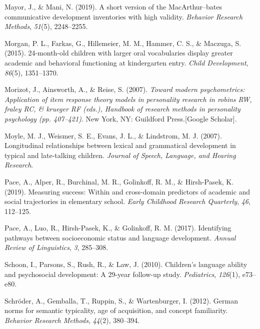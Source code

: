 \documentclass[
  man,floatsintext]{apa6}
\newlength{\cslhangindent}
\newlength{\cslentryspacingunit} %
\newenvironment{CSLReferences}[2] %
 {%
  \setlength{\parindent}{0pt}
  \ifodd #1
  \let\oldpar\par
  \def\par{\hangindent=\cslhangindent\oldpar}
  \fi
  \setlength{\parskip}{#2\cslentryspacingunit}
 }%
 {}
\begin{document}
\begin{CSLReferences}{1}{0}
\leavevmode{}%
Mayor, J., \& Mani, N. (2019). A short version of the MacArthur--bates communicative development inventories with high validity. \emph{Behavior Research Methods}, \emph{51}(5), 2248--2255.

\leavevmode{}%
Morgan, P. L., Farkas, G., Hillemeier, M. M., Hammer, C. S., \& Maczuga, S. (2015). 24-month-old children with larger oral vocabularies display greater academic and behavioral functioning at kindergarten entry. \emph{Child Development}, \emph{86}(5), 1351--1370.

\leavevmode{}%
Morizot, J., Ainsworth, A., \& Reise, S. (2007). \emph{Toward modern psychometrics: Application of item response theory models in personality research in robins RW, fraley RC, \& krueger RF (eds.), Handbook of research methods in personality psychology (pp. 407--421)}. New York, NY: Guildford Press.{[}Google Scholar{]}.

\leavevmode{}%
Moyle, M. J., Weismer, S. E., Evans, J. L., \& Lindstrom, M. J. (2007). Longitudinal relationships between lexical and grammatical development in typical and late-talking children. \emph{Journal of Speech, Language, and Hearing Research}.

\leavevmode{}%
Pace, A., Alper, R., Burchinal, M. R., Golinkoff, R. M., \& Hirsh-Pasek, K. (2019). Measuring success: Within and cross-domain predictors of academic and social trajectories in elementary school. \emph{Early Childhood Research Quarterly}, \emph{46}, 112--125.

\leavevmode{}%
Pace, A., Luo, R., Hirsh-Pasek, K., \& Golinkoff, R. M. (2017). Identifying pathways between socioeconomic status and language development. \emph{Annual Review of Linguistics}, \emph{3}, 285--308.

\leavevmode{}%
Schoon, I., Parsons, S., Rush, R., \& Law, J. (2010). Children's language ability and psychosocial development: A 29-year follow-up study. \emph{Pediatrics}, \emph{126}(1), e73--e80.

\leavevmode{}%
Schröder, A., Gemballa, T., Ruppin, S., \& Wartenburger, I. (2012). German norms for semantic typicality, age of acquisition, and concept familiarity. \emph{Behavior Research Methods}, \emph{44}(2), 380--394.


\end{CSLReferences}
\end{document}
